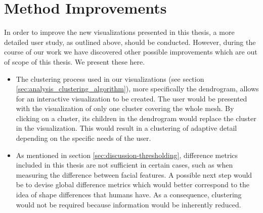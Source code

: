 \section{Method Improvements}

In order to improve the new visualizations presented in this thesis, a more detailed user study, as outlined above, should be conducted. However, during the course of our work we have discovered other possible improvements which are out of scope of this thesis. We present these here.

\begin{itemize}
	\item The clustering process used in our visualizations (see section \ref{sec:analysis_clustering_algorithm}), more specifically the dendrogram, allows for an interactive visualization to be created. The user would be presented with the visualization of only one cluster covering the whole mesh. By clicking on a cluster, its children in the dendrogram would replace the cluster in the visualization. This would result in a clustering of adaptive detail depending on the specific needs of the user.
	\item As mentioned in section \ref{sec:discussion-thresholding}, difference metrics included in this thesis are not sufficient in certain cases, such as when measuring the difference between facial features. A possible next step would be to devise global difference metrics which would better correspond to the idea of shape differences that humans have. As a consequence, clustering would not be required because information would be inherently reduced.
\end{itemize}

